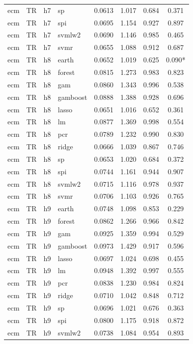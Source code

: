\begin{ThreePartTable}
\begin{longtable}[t]{llclcccc}
ecm & TR & h7 & sp & 0.0613 & 1.017 & 0.684 & 0.371\\
ecm & TR & h7 & spi & 0.0695 & 1.154 & 0.927 & 0.897\\
ecm & TR & h7 & svmlw2 & 0.0690 & 1.146 & 0.985 & 0.465\\
ecm & TR & h7 & svmr & 0.0655 & 1.088 & 0.912 & 0.687\\
\addlinespace
ecm & TR & h8 & earth & 0.0652 & 1.019 & 0.625 & 0.090*\\
ecm & TR & h8 & forest & 0.0815 & 1.273 & 0.983 & 0.823\\
ecm & TR & h8 & gam & 0.0860 & 1.343 & 0.996 & 0.538\\
ecm & TR & h8 & gamboost & 0.0888 & 1.388 & 0.928 & 0.696\\
ecm & TR & h8 & lasso & 0.0651 & 1.016 & 0.652 & 0.361\\
ecm & TR & h8 & lm & 0.0877 & 1.369 & 0.998 & 0.554\\
ecm & TR & h8 & pcr & 0.0789 & 1.232 & 0.990 & 0.830\\
ecm & TR & h8 & ridge & 0.0666 & 1.039 & 0.867 & 0.746\\
ecm & TR & h8 & sp & 0.0653 & 1.020 & 0.684 & 0.372\\
ecm & TR & h8 & spi & 0.0744 & 1.161 & 0.944 & 0.907\\
ecm & TR & h8 & svmlw2 & 0.0715 & 1.116 & 0.978 & 0.937\\
ecm & TR & h8 & svmr & 0.0706 & 1.103 & 0.926 & 0.765\\
\addlinespace
ecm & TR & h9 & earth & 0.0748 & 1.098 & 0.853 & 0.229\\
ecm & TR & h9 & forest & 0.0862 & 1.266 & 0.966 & 0.842\\
ecm & TR & h9 & gam & 0.0925 & 1.359 & 0.994 & 0.529\\
ecm & TR & h9 & gamboost & 0.0973 & 1.429 & 0.917 & 0.596\\
ecm & TR & h9 & lasso & 0.0697 & 1.024 & 0.698 & 0.455\\
ecm & TR & h9 & lm & 0.0948 & 1.392 & 0.997 & 0.555\\
ecm & TR & h9 & pcr & 0.0838 & 1.230 & 0.984 & 0.824\\
ecm & TR & h9 & ridge & 0.0710 & 1.042 & 0.848 & 0.712\\
ecm & TR & h9 & sp & 0.0696 & 1.021 & 0.676 & 0.363\\
ecm & TR & h9 & spi & 0.0800 & 1.175 & 0.918 & 0.872\\
ecm & TR & h9 & svmlw2 & 0.0738 & 1.084 & 0.954 & 0.893\\

\end{longtable}
\end{ThreePartTable}
